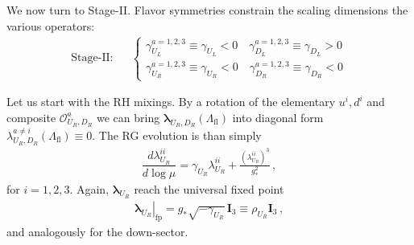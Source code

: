 \documentclass[aps,prl,twocolumn,showpacs,10pt,preprintnumbers,nofootinbib]{revtex4-2}
\newcommand{\gst}{g_*}
\newcommand{\Lfl}{\Lambda_{\text{fl}}}
\newcommand{\fp}[1]{{\left.#1\right|_{\text{fp}}}}
\newcommand{\op}{\mathcal{O}}
\begin{document}
{We now turn to Stage-II. Flavor symmetries constrain the scaling dimensions the various operators:
\begin{align}\label{Eq:StageIIApp}
    \text{Stage-II}:&&\begin{cases}
        \gamma_{U_L}^{a=1,2,3}\equiv \gamma_{U_L}<0\quad
        \gamma_{D_L}^{a=1,2,3}\equiv \gamma_{D_L}>0\\
        \gamma_{U_R}^{a=1,2,3}\equiv \gamma_{U_R}<0\quad
        \gamma_{D_R}^{a=1,2,3}\equiv \gamma_{D_R}<0
    \end{cases}
\end{align}

Let us start with the RH mixings. By a rotation of the elementary $u^i,d^i$ and composite $\op_{U_R,D_R}^{a}$ we can bring $\boldsymbol{\lambda}_{U_R,D_R}(\Lfl)$ into diagonal form $\lambda_{U_R,D_R}^{a\neq i}(\Lfl)\equiv 0$. The RG evolution is than simply
\begin{align}
    \dfrac{d\lambda_{U_R}^{ii} }{d\log \mu} = \gamma_{U_R}\lambda_{U_R}^{ii} +\frac{(\lambda_{U_R}^{ii})^3}{\gst^2}\,,
\end{align}
for $i=1,2,3$. Again, $\boldsymbol{\lambda}_{U_R}$ reach the universal fixed point 
\begin{align}\label{Eq:IdentityUPMFV}
\fp{\boldsymbol{\lambda}_{U_R}}=\gst\sqrt{-\gamma_{U_R}}\,\mathbf{I}_3 \equiv \rho_{U_R} \mathbf{I}_3\,,
\end{align}
and analogously for the down-sector. 

}
\end{document}
